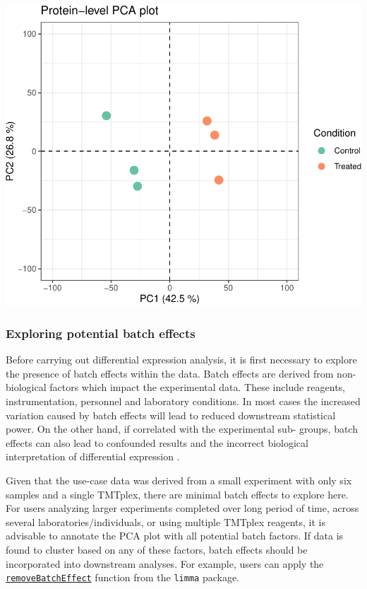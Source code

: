 \documentclass[9pt,a4paper,]{extarticle}
\begin{document}
\begin{center}\includegraphics[height=0.4\textheight]{workflow_expressions_files/figure-latex/protein_pca_plot-1} \end{center}

\subsubsection{Exploring potential batch effects}\label{exploring-potential-batch-effects}

Before carrying out differential expression analysis, it is first necessary to
explore the presence of batch effects within the data. Batch effects are derived
from non-biological factors which impact the experimental data. These include
reagents, instrumentation, personnel and laboratory conditions. In most cases
the increased variation caused by batch effects will lead to reduced downstream
statistical power. On the other hand, if correlated with the experimental sub-
groups, batch effects can also lead to confounded results and the incorrect
biological interpretation of differential expression \citep{Leek2010}.

Given that the use-case data was derived from a small experiment with only six
samples and a single TMTplex, there are minimal batch effects to explore here.
For users analyzing larger experiments completed over long period of time, across
several laboratories/individuals, or using multiple TMTplex reagents, it is
advisable to annotate the PCA plot with all potential batch factors. If data is
found to cluster based on any of these factors, batch effects should be
incorporated into downstream analyses. For example, users can apply the
\href{https://rdrr.io/bioc/limma/man/removeBatchEffect.html}{\texttt{removeBatchEffect}}
function from the \texttt{limma} package.
\end{document}
